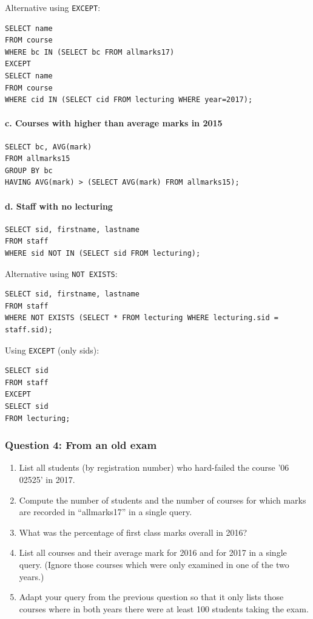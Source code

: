 Alternative using \texttt{EXCEPT}:
\begin{verbatim}
SELECT name
FROM course
WHERE bc IN (SELECT bc FROM allmarks17)
EXCEPT
SELECT name
FROM course
WHERE cid IN (SELECT cid FROM lecturing WHERE year=2017);
\end{verbatim}

\paragraph{c. Courses with higher than average marks in 2015}
\begin{verbatim}
SELECT bc, AVG(mark)
FROM allmarks15
GROUP BY bc
HAVING AVG(mark) > (SELECT AVG(mark) FROM allmarks15);
\end{verbatim}

\paragraph{d. Staff with no lecturing}
\begin{verbatim}
SELECT sid, firstname, lastname
FROM staff
WHERE sid NOT IN (SELECT sid FROM lecturing);
\end{verbatim}

Alternative using \texttt{NOT EXISTS}:
\begin{verbatim}
SELECT sid, firstname, lastname
FROM staff
WHERE NOT EXISTS (SELECT * FROM lecturing WHERE lecturing.sid = staff.sid);
\end{verbatim}

Using \texttt{EXCEPT} (only sids):
\begin{verbatim}
SELECT sid
FROM staff
EXCEPT
SELECT sid
FROM lecturing;
\end{verbatim}
\subsubsection{Question 4: From an old exam}
\begin{enumerate}[label=\alph*)]
\item List all students (by registration number) who hard-failed the course '06 02525' in 2017.

\item Compute the number of students and the number of courses for which marks are recorded in ``allmarks17'' in a single query.

\item What was the percentage of first class marks overall in 2016?

\item List all courses and their average mark for 2016 and for 2017 in a single query. (Ignore those courses which were only examined in one of the two years.)

\item Adapt your query from the previous question so that it only lists those courses where in both years there were at least 100 students taking the exam.
\end{enumerate}

